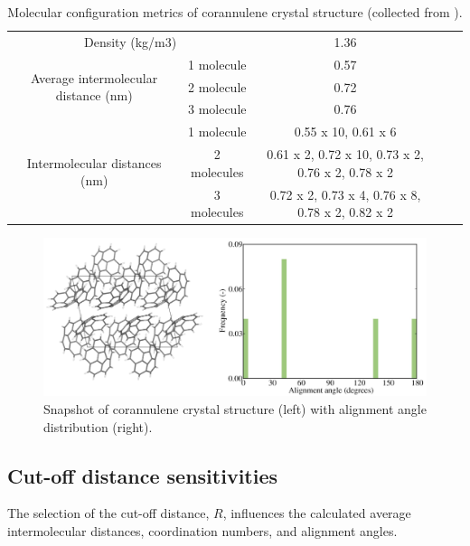 \begin{table}[]
\centering
\caption{Molecular configuration metrics of corannulene crystal structure (collected from \cite{CORANN11unitcell}).}
\label{table:crystal}
\begin{tabular}{cc|cll}
\multicolumn{2}{c}{Density (kg/m3)} & 1.36 \cite{CORANN11unitcell}&  &  \\ \cline{1-3}
\multirow{3}{*}{Average intermolecular distance (nm)} & 1 molecule & 0.57 &  &  \\
 & 2 molecule & 0.72 &  &  \\
 & 3 molecule & 0.76 &  &  \\ \cline{1-3}
\multirow{3}{*}{Intermolecular distances (nm)} & 1 molecule & 0.55 x 10, 0.61 x 6 &  &  \\
 & 2 molecules & 0.61 x 2, 0.72 x 10, 0.73 x 2, 0.76 x 2, 0.78 x 2 &  &  \\
 & 3 molecules & 0.72 x 2, 0.73 x 4, 0.76 x 8, 0.78 x 2, 0.82 x 2 &  & 
\end{tabular}
\end{table}
%
%
\begin{figure}[!tbh]
\centering
\includegraphics[width=0.65\linewidth]{Figures/corannulene_crystal.eps}
\caption{Snapshot of corannulene crystal structure (left) with alignment angle distribution (right).}
\label{figSI:corannulene_crystal}
\end{figure}
%

\subsection{Cut-off distance sensitivities}
The selection of the cut-off distance, $R$, influences the calculated average intermolecular distances, coordination numbers, and alignment angles.


